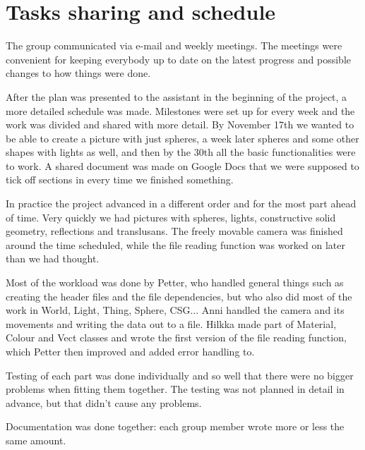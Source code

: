 
\section{Tasks sharing and schedule}



	
The group communicated via e-mail and weekly meetings. The meetings were convenient for keeping everybody up to date on the latest progress and possible changes to how things were done.

After the plan was presented to the assistant in the beginning of the project, a more detailed schedule was made. Milestones were set up for every week and the work was divided and shared with more detail. By November 17th we wanted to be able to create a picture with just spheres, a week later spheres and some other shapes with lights as well, and then by the 30th all the basic functionalities were to work. A shared document was made on Google Docs that we were supposed to tick off sections in every time we finished something.

In practice the project advanced in a different order and for the most part ahead of time. Very quickly we had pictures with spheres, lights, constructive solid geometry, reflections and translusans. The freely movable camera was finished around the time scheduled, while the file reading function was worked on later than we had thought.

Most of the workload was done by Petter, who handled general things such as creating the header files and the file dependencies, but who also did most of the work in World, Light, Thing, Sphere, CSG... Anni handled the camera and its movements and writing the data out to a file. Hilkka made part of Material, Colour and Vect classes and wrote the first version of the file reading function, which Petter then improved and added error handling to.

Testing of each part was done individually and so well that there were no bigger problems when fitting them together. The testing was not planned in detail in advance, but that didn't cause any problems.

Documentation was done together: each group member wrote more or less the same amount.